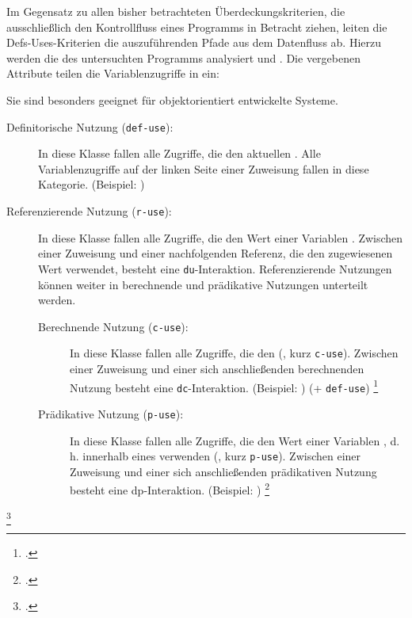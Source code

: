 \documentclass{bschlangaul-theorie}
\begin{document}
\begin{bQuellen}
\item \cite[Kapitel 8.6.3 „Methoden zur Testfallermittlung“, Seite 250-251]{schneider}
\item \cite[Kapitel 4.4.7 Def-Uses-Überdeckung, Seite 220-227]{hoffmann:software}

\end{bQuellen}
Im Gegensatz zu allen bisher betrachteten Überdeckungskriterien, die
ausschließlich den Kontrollfluss eines Programms in Betracht ziehen,
leiten die Defs-Uses-Kriterien die auszuführenden Pfade aus dem
Datenfluss ab. Hierzu werden die  des
untersuchten Programms analysiert und . Die vergebenen Attribute teilen die
Variablenzugriffe in  ein:

Sie sind besonders geeignet für objektorientiert entwickelte Systeme.

\def\TmpBeispiel#1{(Beispiel: \bJavaCode{#1})}

\begin{description}
\item[Definitorische Nutzung (\texttt{def-use}):]

In diese Klasse fallen alle Zugriffe, die den aktuellen . Alle Variablenzugriffe auf der linken
Seite einer Zuweisung fallen in diese Kategorie. \TmpBeispiel{x = 42;}

\item[Referenzierende Nutzung (\texttt{r-use}):]

In diese Klasse fallen alle Zugriffe, die den Wert einer Variablen
. Zwischen einer Zuweisung und
einer nachfolgenden Referenz, die den zugewiesenen Wert verwendet,
besteht eine \texttt{du}-Interaktion. Referenzierende Nutzungen können
weiter in berechnende und prädikative Nutzungen unterteilt werden.

\begin{description}
\item[Berechnende Nutzung (\texttt{c-use}):]

In diese Klasse fallen alle Zugriffe, die den  (,
kurz \texttt{c-use}). Zwischen einer Zuweisung und einer sich
anschließenden berechnenden Nutzung besteht eine
\texttt{dc}-Interaktion. \TmpBeispiel{x = x * 2;} (+ \texttt{def-use})
\footcite[Seite 220]{hoffmann:software}

\item[Prädikative Nutzung (\texttt{p-use}):]

In diese Klasse fallen alle Zugriffe, die den Wert einer Variablen
, d. h. innerhalb eines 
verwenden (, kurz \texttt{p-use}). Zwischen einer
Zuweisung und einer sich anschließenden prädikativen Nutzung besteht
eine dp-Interaktion. \TmpBeispiel{if (x > 42)}
\footcite[Seite 221]{hoffmann:software}
\end{description}
\end{description}
\footcite[Seite 42]{sosy:fs:5}
\end{document}
